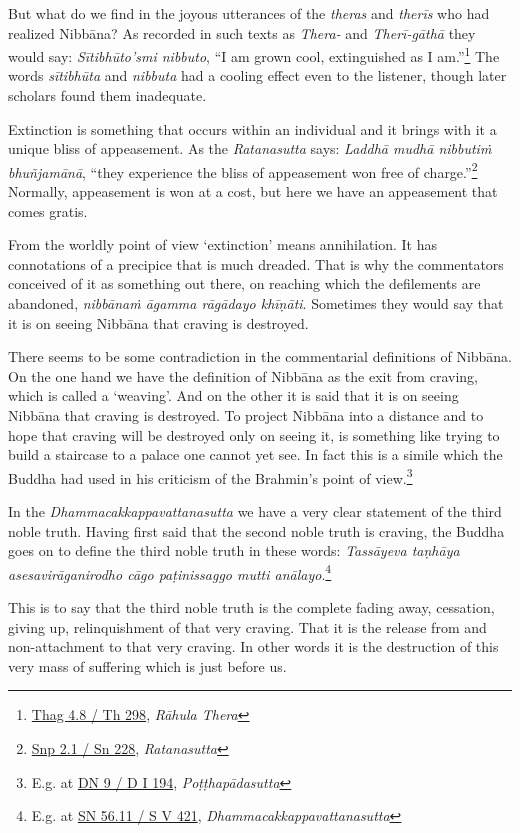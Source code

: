 But what do we find in the joyous utterances of the \emph{theras} and \emph{therīs} who had realized Nibbāna? As recorded in such texts as \emph{Thera-} and \emph{Therī-gāthā} they would say: \emph{Sītibhūto'smi nibbuto}, ``I am grown cool, extinguished as I am.''\footnote{\href{https://suttacentral.net/thag4.8/pli/ms}{Thag 4.8 / Th 298}, \emph{Rāhula Thera}} The words \emph{sītibhūta} and \emph{nibbuta} had a cooling effect even to the listener, though later scholars found them inadequate.

Extinction is something that occurs within an individual and it brings with it a unique bliss of appeasement. As the \emph{Ratanasutta} says: \emph{Laddhā mudhā nibbutiṁ bhuñjamānā}, ``they experience the bliss of appeasement won free of charge.''\footnote{\href{https://suttacentral.net/snp2.1/pli/ms}{Snp 2.1 / Sn 228}, \emph{Ratanasutta}} Normally, appeasement is won at a cost, but here we have an appeasement that comes gratis.

From the worldly point of view `extinction' means annihilation. It has connotations of a precipice that is much dreaded. That is why the commentators conceived of it as something out there, on reaching which the defilements are abandoned, \emph{nibbānaṁ āgamma rāgādayo khīṇāti}. Sometimes they would say that it is on seeing Nibbāna that craving is destroyed.

There seems to be some contradiction in the commentarial definitions of Nibbāna. On the one hand we have the definition of Nibbāna as the exit from craving, which is called a `weaving'. And on the other it is said that it is on seeing Nibbāna that craving is destroyed. To project Nibbāna into a distance and to hope that craving will be destroyed only on seeing it, is something like trying to build a staircase to a palace one cannot yet see. In fact this is a simile which the Buddha had used in his criticism of the Brahmin's point of view.\footnote{E.g. at \href{https://suttacentral.net/dn9/pli/ms}{DN 9 / D I 194}, \emph{Poṭṭhapādasutta}}

In the \emph{Dhammacakkappavattanasutta} we have a very clear statement of the third noble truth. Having first said that the second noble truth is craving, the Buddha goes on to define the third noble truth in these words: \emph{Tassāyeva taṇhāya asesavirāganirodho cāgo paṭinissaggo mutti anālayo}.\footnote{E.g. at \href{https://suttacentral.net/sn56.11/pli/ms}{SN 56.11 / S V 421}, \emph{Dhammacakkappavattanasutta}}

This is to say that the third noble truth is the complete fading away, cessation, giving up, relinquishment of that very craving. That it is the release from and non-attachment to that very craving. In other words it is the destruction of this very mass of suffering which is just before us.

